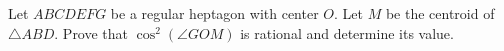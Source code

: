 Let $ABCDEFG$ be a regular heptagon with center $O$. Let $M$ be the centroid of $\triangle ABD$. Prove that $\cos^2(\angle GOM)$ is rational and determine its value.